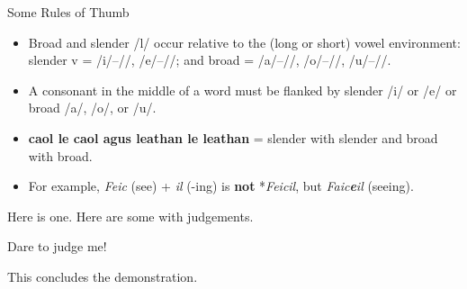 \documentclass[11pt]{article}
\begin{document}
\vspace{1cm}
{\sc Some Rules of Thumb}
\begin{itemize}
\item Broad and slender /l/ occur relative to the (long or short) vowel environment: slender v = /i/--//, /e/--//; and broad = /a/--//, /o/--//, /u/--//.
\item A consonant in the middle of a word must be flanked by slender /i/ or /e/ or broad /a/, /o/, or /u/.
\item {\bf caol le caol agus leathan le leathan} = slender with slender and broad with broad.
\item For example, {\sl Feic} (see) + {\sl {}il} (-ing) is {\bf not} *{\sl Feicil}, but {\sl Faic{\bf e}il} (seeing).
\end{itemize}
 









\newpage
\begin{exe} %
\ex\label{here} Here is one. %
\ex Here are some with judgements.
\begin{xlist} %
\ex %
\begin{xlist} %
\end{xlist} %
\ex Dare to judge me!
\end{xlist} %
\ex This concludes the demonstration.
\end{exe}

%




 
\end{document}
